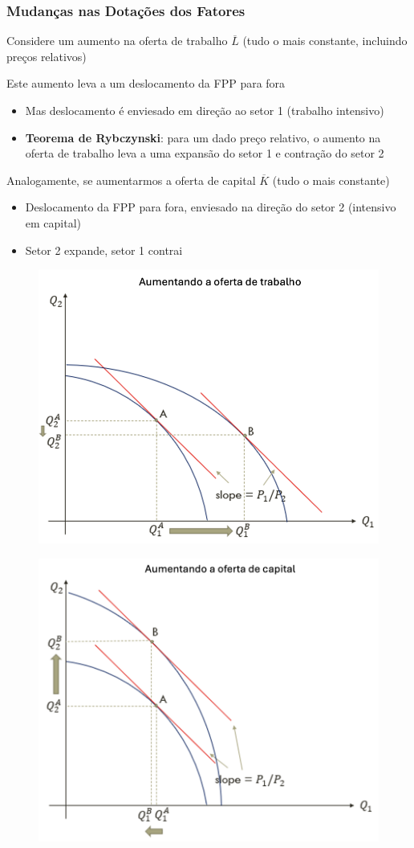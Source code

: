 \documentclass[a4paper,12pt]{article}[abntex2]
\begin{document}
\subsubsection{\textbf{Mudanças nas Dotações dos Fatores}}

Considere um aumento na oferta de trabalho \( \overline{L} \) (tudo o mais constante, incluindo preços relativos)

Este aumento leva a um deslocamento da FPP para fora
\begin{itemize}
    \item Mas deslocamento é enviesado em direção ao setor 1 (trabalho intensivo)
    \item \textbf{Teorema de Rybczynski}: para um dado preço relativo, o aumento na oferta de trabalho leva a uma expansão do setor 1 e contração do setor 2
\end{itemize}

Analogamente, se aumentarmos a oferta de capital \( \overline{K} \) (tudo o mais constante)
\begin{itemize}
    \item Deslocamento da FPP para fora, enviesado na direção do setor 2 (intensivo em capital)
    \item Setor 2 expande, setor 1 contrai
\end{itemize}


\begin{figure}[H]
    \centering
    \includegraphics[width=0.7\linewidth]{Imagens/a12i4.png}
\end{figure}

\begin{figure}[H]
    \centering
    \includegraphics[width=0.7\linewidth]{Imagens/a12i5.png}
\end{figure}
\end{document}

